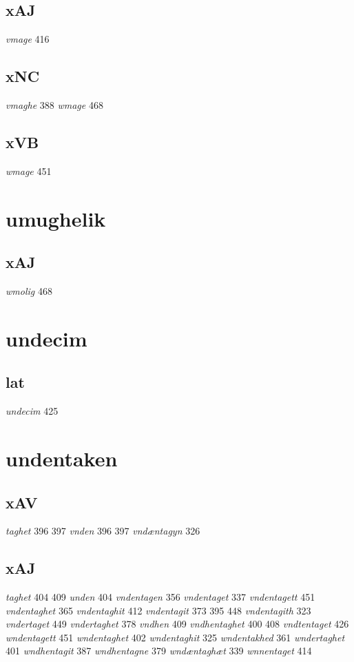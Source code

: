 \documentclass[a4paper,twocolumn]{article}
\begin{document}
\subsection{xAJ}
\label{sec:orgb043d7e}
\emph{vmage} 416 
\subsection{xNC}
\label{sec:org22ce5f3}
\emph{vmaghe} 388 \emph{wmage} 468 
\subsection{xVB}
\label{sec:orgd81cdf9}
\emph{wmage} 451 
\section{umughelik}
\label{sec:org172c021}
\subsection{xAJ}
\label{sec:org87ae0e5}
\emph{wmolig} 468 
\section{undecim}
\label{sec:org130a381}
\subsection{lat}
\label{sec:orgaffdb48}
\emph{undecim} 425 
\section{undentaken}
\label{sec:org28bd9b7}
\subsection{xAV}
\label{sec:org7ca8e90}
\emph{taghet} 396 397 \emph{vnden} 396 397 \emph{vndæntagyn} 326 
\subsection{xAJ}
\label{sec:org5a3c76b}
\emph{taghet} 404 409 \emph{unden} 404 \emph{vndentagen} 356 \emph{vndentaget} 337 \emph{vndentagett} 451 \emph{vndentaghet} 365 \emph{vndentaghit} 412 \emph{vndentagit} 373 395 448 \emph{vndentagith} 323 \emph{vndertaget} 449 \emph{vndertaghet} 378 \emph{vndhen} 409 \emph{vndhentaghet} 400 408 \emph{vndtentaget} 426 \emph{wndentagett} 451 \emph{wndentaghet} 402 \emph{wndentaghit} 325 \emph{wndentakhed} 361 \emph{wndertaghet} 401 \emph{wndhentagit} 387 \emph{wndhentagne} 379 \emph{wndæntaghæt} 339 \emph{wnnentaget} 414 
\end{document}
